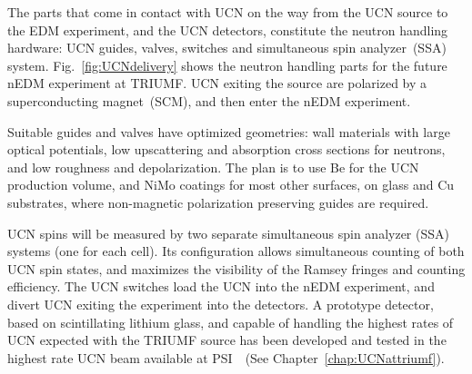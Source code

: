 The parts that come in contact with UCN on the way from the UCN source
to the EDM experiment, and the UCN detectors, constitute the neutron
handling hardware: UCN guides, valves, switches and simultaneous spin
analyzer~(SSA) system. Fig.~\ref{fig:UCNdelivery} shows the neutron
handling parts for the future nEDM experiment at TRIUMF.  UCN exiting
the source are polarized by a superconducting magnet~(SCM), and then
enter the nEDM experiment.

Suitable guides and valves have optimized geometries: wall materials
with large optical potentials, low upscattering and absorption cross
sections for neutrons, and low roughness and depolarization. The plan
is to use Be for the UCN production volume, and NiMo coatings for most
other surfaces, on glass and Cu substrates, where non-magnetic
polarization preserving guides are required.

UCN spins will be measured by two separate simultaneous spin analyzer
(SSA) systems (one for each cell). Its configuration allows
simultaneous counting of both UCN spin states, and maximizes the
visibility of the Ramsey fringes and counting efficiency.  The UCN
switches load the UCN into the nEDM experiment, and divert UCN exiting
the experiment into the detectors.  A prototype detector, based on
scintillating lithium glass, and capable of handling the highest rates
of UCN expected with the TRIUMF source has been developed and tested
in the highest rate UCN beam available at
PSI~\cite{jamieson2017characterization}~(See
Chapter~\ref{chap:UCNattriumf}).





